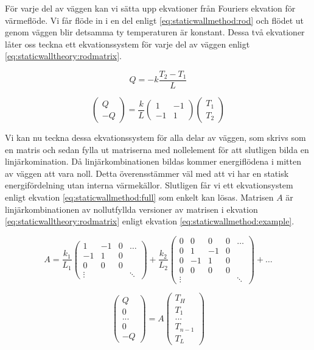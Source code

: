 För varje del av väggen kan vi sätta upp ekvationer från Fouriers ekvation
för värmeflöde. Vi får flöde in i en del enligt \eqref{eq:staticwallmethod:rod} och
flödet ut genom väggen blir detsamma ty temperaturen är konstant. Dessa två
ekvationer låter oss teckna ett ekvationssystem för varje del av väggen
enligt \eqref{eq:staticwalltheory:rodmatrix}. \cite{lewis04}

\begin{equation}
\label{eq:staticwallmethod:rod}
Q = -k\frac{T_{2}-T_{1}}{L}
\end{equation}


\begin{equation}
\label{eq:staticwalltheory:rodmatrix}
\begin{pmatrix}
Q \\
-Q
\end{pmatrix} = 
\frac{k}{L}\begin{pmatrix}
1 & -1 \\
-1 & 1
\end{pmatrix}
\begin{pmatrix}
T_1 \\
T_2
\end{pmatrix}
\end{equation}

\noindent
Vi kan nu teckna dessa ekvationssystem för alla delar av väggen, som skrivs som 
en matris och sedan fylla ut matriserna med nollelement för att slutligen bilda 
en linjärkomination.
Då linjärkombinationen bildas kommer energiflödena i mitten av väggen att
vara noll. Detta överensstämmer väl med att vi har en statisk energifördelning
utan interna värmekällor.
Slutligen får vi ett ekvationsystem enligt ekvation
\eqref{eq:staticwallmethod:full} som enkelt kan lösas.
Matrisen $A$ är linjärkombinationen av nollutfyllda versioner av matrisen i ekvation
\eqref{eq:staticwalltheory:rodmatrix} enligt ekvation
\eqref{eq:staticwallmethod:example}.

\begin{equation}
\label{eq:staticwallmethod:example}
A = \frac{k_1}{L_1}
\begin{pmatrix}
1 & -1 & 0 &  \dots \\
-1 & 1 & 0 &   \\
0 & 0 & 0 &  \\
\vdots & & & \ddots
\end{pmatrix}
+
\frac{k_2}{L_2}
\begin{pmatrix}
0 & 0 & 0 & 0 & \dots \\
0 & 1 & -1 & 0 &  \\
0 & -1 & 1 & 0 & \\
0 & 0 & 0 & 0 & \\
\vdots & & & & \ddots
\end{pmatrix} + \dots
\end{equation}

\begin{equation}
\label{eq:staticwallmethod:full}
\begin{pmatrix}
Q\\0\\...\\0\\-Q
\end{pmatrix} = A
\begin{pmatrix}
T_H\\T_1\\...\\T_{n-1}\\T_L
\end{pmatrix}
\end{equation}
